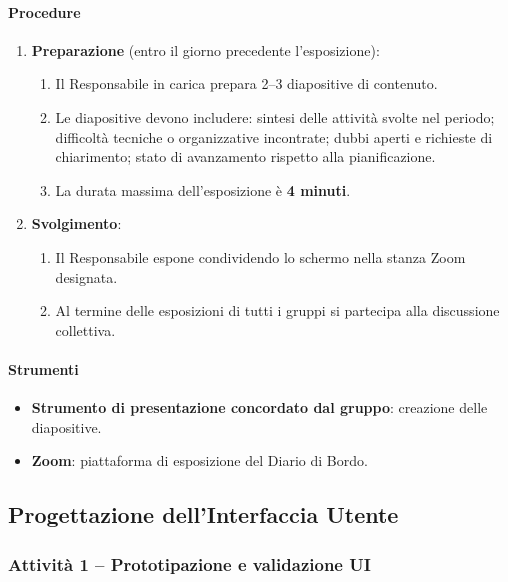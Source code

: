 \documentclass[a4paper, 11pt, oneside]{scrartcl}
\begin{document}
\paragraph{Procedure}
\begin{enumerate}
    \item \textbf{Preparazione} (entro il giorno precedente l'esposizione):
    \begin{enumerate}[label=\alph*.]
        \item Il Responsabile in carica prepara 2–3 diapositive di contenuto.
        \item Le diapositive devono includere: sintesi delle attività svolte nel periodo; difficoltà tecniche o organizzative incontrate; dubbi aperti e richieste di chiarimento; stato di avanzamento rispetto alla pianificazione.
        \item La durata massima dell'esposizione è \textbf{4 minuti}.
    \end{enumerate}
    \item \textbf{Svolgimento}:
    \begin{enumerate}[label=\alph*.]
        \item Il Responsabile espone condividendo lo schermo nella stanza Zoom designata.
        \item Al termine delle esposizioni di tutti i gruppi si partecipa alla discussione collettiva.
    \end{enumerate}
\end{enumerate}

\paragraph{Strumenti}
\begin{itemize}
    \item \textbf{Strumento di presentazione concordato dal gruppo}: creazione delle diapositive.
    \item \textbf{Zoom}: piattaforma di esposizione del Diario di Bordo.
\end{itemize}

\subsection{Progettazione dell'Interfaccia Utente}

\subsubsection{Attività 1 – Prototipazione e validazione UI}
\end{document}
